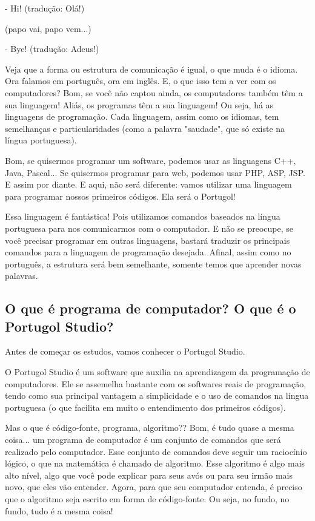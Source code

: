 \documentclass{article}
\begin{document}
- Hi! (tradução: Olá!)

(papo vai, papo vem...)

- Bye! (tradução: Adeus!)

Veja que a forma ou estrutura de comunicação é igual, o que muda é o idioma. Ora falamos em português, ora em inglês. E, o que isso tem a ver com os computadores? Bom, se você não captou ainda, os computadores também têm a sua linguagem! Aliás, os programas têm a sua linguagem! Ou seja, há as linguagens de programação. Cada linguagem, assim como os idiomas, tem semelhanças e particularidades (como a palavra "saudade", que só existe na língua portuguesa).

Bom, se quisermos programar um software, podemos usar as linguagens C++, Java, Pascal... Se quisermos programar para web, podemos usar PHP, ASP, JSP. E assim por diante. E aqui, não será diferente: vamos utilizar uma linguagem para programar nossos primeiros códigos. Ela será o Portugol!

Essa linguagem é fantástica! Pois utilizamos comandos baseados na língua portuguesa para nos comunicarmos com o computador. E não se preocupe, se você precisar programar em outras linguagens, bastará traduzir os principais comandos para a linguagem de programação desejada. Afinal, assim como no português, a estrutura será bem semelhante, somente temos que aprender novas palavras.

\subsection{O que é programa de computador? O que é o Portugol Studio?}
Antes de começar os estudos, vamos conhecer o Portugol Studio. 

O Portugol Studio é um software que auxilia na aprendizagem da programação de computadores. Ele se assemelha bastante com os softwares reais de programação, tendo como sua principal vantagem a simplicidade e o uso de comandos na língua portuguesa (o que facilita em muito o entendimento dos primeiros códigos).

Mas o que é código-fonte, programa, algoritmo?? Bom, é tudo quase a mesma coisa... um programa de computador é um conjunto de comandos que será realizado pelo computador. Esse conjunto de comandos deve seguir um raciocínio lógico, o que na matemática é chamado de algoritmo. Esse algoritmo é algo mais alto nível, algo que você pode explicar para seus avós ou para seu irmão mais novo, que eles vão entender. Agora, para que seu computador entenda, é preciso que o algoritmo seja escrito em forma de código-fonte. Ou seja, no fundo, no fundo, tudo é a mesma coisa!
\end{document}
